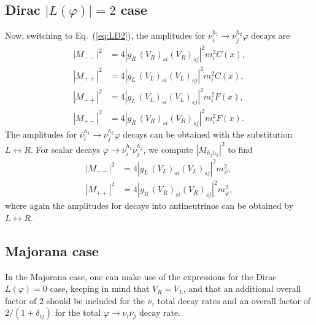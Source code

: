 \documentclass[
reprint,
superscriptaddress,
showpacs,
preprintnumbers,
nofootinbib,
nobibnotes,
amsmath,
amssymb, 
aps,
prd,
floatfix
]{revtex4-1}
\newcommand{\refeq}[1]{Eq.~(\ref{#1})}
\renewcommand{\phi}{\varphi}
\begin{document}
\subsection{Dirac $|L(\phi)|=2$ case}

Now, switching to \refeq{eq:LD2}, the amplitudes for $\nu_i^{h_1}\to\overline{\nu}_j^{h_2} \phi$ decays are
\begin{align}
    |M_{--} |^2 &= 4|g_R \,(V_R)_{si} (V_R)_{sj}|^2 m_i^2 C(x),
    \\
    |M_{++}|^2 &= 4|g_L \,(V_L)_{si} (V_L)_{sj}|^2 m_i^2 C(x),
    \\
    |M_{-+} |^2 &= 4|g_L \,(V_L)_{si} (V_L)_{sj}|^2 m_i^2 F(x),
    \\
    |M_{+-}|^2 &= 4|g_R \,(V_R)_{si} (V_R)_{sj}|^2 m_i^2 F(x).
\end{align}
The amplitudes for $\overline{\nu}_i^{h_1}\to\nu_j^{h_2} \phi$ decays can be obtained with the substitution $L\leftrightarrow R$. For scalar decays $\phi \to \nu^{h_1}_i \nu^{h_2}_j$, we compute $|M_{h_1 h_2}|^2$ to find
\begin{align}
    |M_{--}|^2 &= 4 |g_L\,(V_L)_{si} (V_L)_{sj}|^2 m_\phi^2,
    \\
    |M_{++}|^2 &= 4 |g_R\,(V_R)_{si} (V_R)_{sj}|^2 m_\phi^2,
\end{align}
where again the amplitudes for decays into antineutrinos can be obtained by $L\leftrightarrow R$.

\subsection{Majorana case}

In the Majorana case, one can make use of the expressions for the Dirac $L(\phi)=0$ case, keeping in mind that $V_R=V_L$, and that an additional overall factor of $2$ should be included for the $\nu_i$ total decay rates and an overall factor of $2/(1+\delta_{ij})$ for the total $\phi\to \nu_i \overline{\nu_j}$ decay rate.
\vfill

{}
\end{document}
